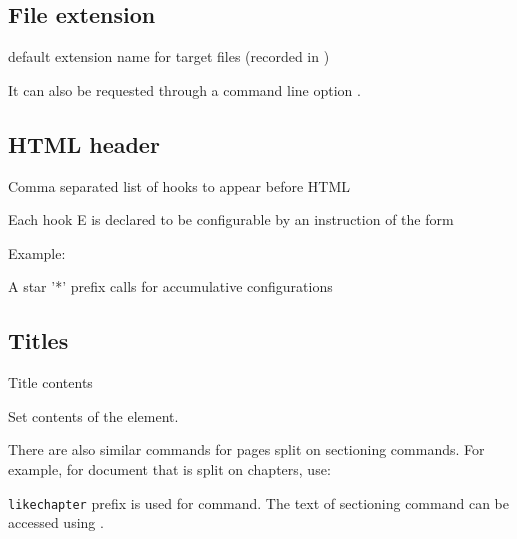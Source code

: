 \subsection{File extension}

 {default extension name for target files  (recorded in )} \EndDoc

It can also be requested through a command line option .

\subsection{HTML header}
 {Comma separated list of hooks to appear before HTML} \EndDoc

Each hook E is declared to be configurable by an instruction of the form 


Example:

\begin{texsource}
\end{texsource}

A star '*' prefix calls for accumulative configurations


\subsection{Titles}

 {Title contents}\EndDoc

Set contents of the  element.

There are also similar commands for pages split on sectioning commands. For example, for document that
is split on chapters, use:

\begin{texsource}
\end{texsource}

\texttt{likechapter} prefix is used for \texcommand{\chapter*} command. The text of sectioning command
can be accessed using .
